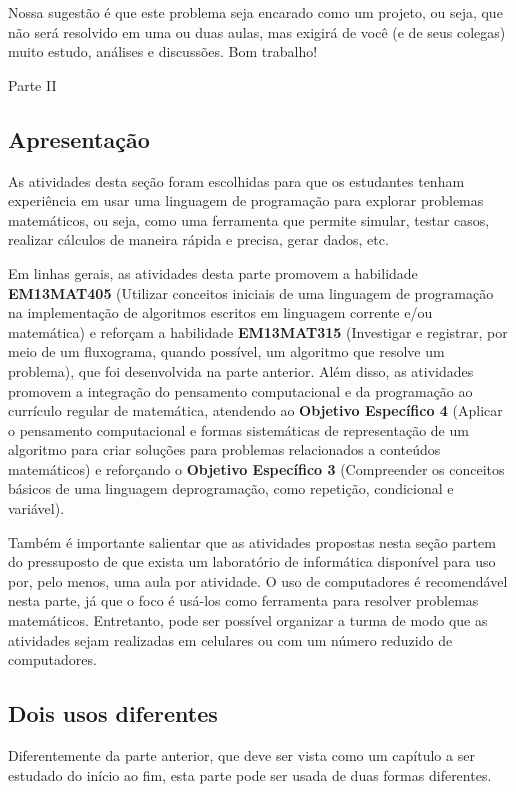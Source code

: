 Nossa sugestão é que este problema seja encarado como um projeto, ou seja, que não será resolvido em uma ou duas aulas, mas exigirá de você (e de seus colegas) muito estudo, análises e discussões. Bom trabalho!

\begin{paginatexto}{Parte II}

\subsection{Apresentação}
As atividades desta seção foram escolhidas para que os estudantes tenham experiência em usar uma linguagem de programação para explorar problemas matemáticos, ou seja, como uma ferramenta que permite simular, testar casos, realizar cálculos de maneira rápida e precisa, gerar dados, etc.

Em linhas gerais, as atividades desta parte promovem a habilidade \textbf{EM13MAT405} (Utilizar conceitos iniciais de uma linguagem de programação na implementação de algoritmos escritos em linguagem corrente e/ou matemática) e reforçam a habilidade \textbf{EM13MAT315} (Investigar e registrar, por meio de um fluxograma, quando possível, um algoritmo que resolve um problema), que foi desenvolvida na parte anterior. Além disso, as atividades promovem a integração do pensamento computacional e da programação ao currículo regular de matemática, atendendo ao \textbf{Objetivo Específico 4} (Aplicar o pensamento computacional e formas sistemáticas de representação de um algoritmo para criar soluções para problemas relacionados a conteúdos matemáticos) e reforçando o \textbf{Objetivo Específico 3} (Compreender os conceitos básicos de uma linguagem deprogramação, como repetição, condicional e variável).

Também é importante salientar que as atividades propostas nesta seção partem do pressuposto de que exista um laboratório de informática disponível para uso por, pelo menos, uma aula por atividade. O uso de computadores é recomendável nesta parte, já que o foco é usá-los como ferramenta para resolver problemas matemáticos. Entretanto, pode ser possível organizar a turma de modo que as atividades sejam realizadas em celulares ou com um número reduzido de computadores.

\subsection{Dois usos diferentes}

Diferentemente da parte anterior, que deve ser vista como um capítulo a ser estudado do início ao fim, esta parte pode ser usada de duas formas diferentes.


\end{paginatexto}
